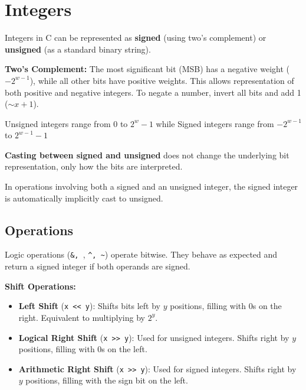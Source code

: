 \section{Integers}

\begin{lemma}
    Integers in C can be represented as \textbf{signed} (using two's complement)
    or \textbf{unsigned} (as a standard binary string).
\end{lemma}

\begin{definition}
    \textbf{Two's Complement:} The most significant bit (MSB) has a negative
    weight ($-2^{w-1}$), while all other bits have positive weights. This allows
    representation of both positive and negative integers. To negate a number,
    invert all bits and add 1 ($\sim x + 1$).
\end{definition}

\begin{remark}
    Unsigned integers range from $0$ to $2^w - 1$ while Signed integers range from $-2^{w-1}$ to $2^{w-1} - 1$
\end{remark}

\begin{lemma}
    \textbf{Casting between signed and unsigned} does not change the underlying
    bit representation, only how the bits are interpreted.
\end{lemma}

\begin{remark}
    In operations involving both a signed and an unsigned integer, the signed
    integer is automatically implicitly cast to unsigned.
\end{remark}

\subsection{Operations}

\begin{remark}
    Logic operations (\verb|&, |, \verb|^, ~|) operate bitwise. They behave as
    expected and return a signed integer if both operands are signed.
\end{remark}

\begin{definition}
    \textbf{Shift Operations:}
    \begin{itemize}
        \item \textbf{Left Shift} (\verb|x << y|): Shifts bits left by $y$
        positions, filling with 0s on the right. Equivalent to multiplying
        by $2^y$.
        \item \textbf{Logical Right Shift} (\verb|x >> y|): Used for unsigned
        integers. Shifts right by $y$ positions, filling with 0s on the
        left.
        \item \textbf{Arithmetic Right Shift} (\verb|x >> y|): Used for signed
        integers. Shifts right by $y$ positions, filling with the sign bit
        on the left.
    \end{itemize}
\end{definition}

